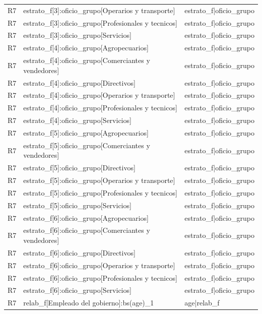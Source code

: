\begin{longtable}{lll}
R7 & estrato\_f[3]:oficio\_grupo[Operarios y transporte] & estrato\_f|oficio\_grupo \\
R7 & estrato\_f[3]:oficio\_grupo[Profesionales y tecnicos] & estrato\_f|oficio\_grupo \\
R7 & estrato\_f[3]:oficio\_grupo[Servicios] & estrato\_f|oficio\_grupo \\
R7 & estrato\_f[4]:oficio\_grupo[Agropecuarios] & estrato\_f|oficio\_grupo \\
R7 & estrato\_f[4]:oficio\_grupo[Comerciantes y vendedores] & estrato\_f|oficio\_grupo \\
R7 & estrato\_f[4]:oficio\_grupo[Directivos] & estrato\_f|oficio\_grupo \\
R7 & estrato\_f[4]:oficio\_grupo[Operarios y transporte] & estrato\_f|oficio\_grupo \\
R7 & estrato\_f[4]:oficio\_grupo[Profesionales y tecnicos] & estrato\_f|oficio\_grupo \\
R7 & estrato\_f[4]:oficio\_grupo[Servicios] & estrato\_f|oficio\_grupo \\
R7 & estrato\_f[5]:oficio\_grupo[Agropecuarios] & estrato\_f|oficio\_grupo \\
R7 & estrato\_f[5]:oficio\_grupo[Comerciantes y vendedores] & estrato\_f|oficio\_grupo \\
R7 & estrato\_f[5]:oficio\_grupo[Directivos] & estrato\_f|oficio\_grupo \\
R7 & estrato\_f[5]:oficio\_grupo[Operarios y transporte] & estrato\_f|oficio\_grupo \\
R7 & estrato\_f[5]:oficio\_grupo[Profesionales y tecnicos] & estrato\_f|oficio\_grupo \\
R7 & estrato\_f[5]:oficio\_grupo[Servicios] & estrato\_f|oficio\_grupo \\
R7 & estrato\_f[6]:oficio\_grupo[Agropecuarios] & estrato\_f|oficio\_grupo \\
R7 & estrato\_f[6]:oficio\_grupo[Comerciantes y vendedores] & estrato\_f|oficio\_grupo \\
R7 & estrato\_f[6]:oficio\_grupo[Directivos] & estrato\_f|oficio\_grupo \\
R7 & estrato\_f[6]:oficio\_grupo[Operarios y transporte] & estrato\_f|oficio\_grupo \\
R7 & estrato\_f[6]:oficio\_grupo[Profesionales y tecnicos] & estrato\_f|oficio\_grupo \\
R7 & estrato\_f[6]:oficio\_grupo[Servicios] & estrato\_f|oficio\_grupo \\
R7 & relab\_f[Empleado del gobierno]:bs(age)\_1 & age|relab\_f \\

\end{longtable}
